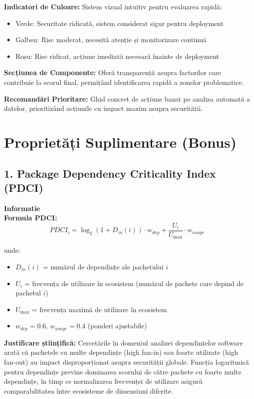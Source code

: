 \documentclass[12pt,a4paper]{article}
\newenvironment{infobox}{%
\begin{leftbar}
\color{black}
\textbf{Informatie}\\[0.5em]
}{%
\end{leftbar}
}
\begin{document}
\textbf{Indicatori de Culoare:} Sistem vizual intuitiv pentru evaluarea rapidă:

\begin{itemize}
\item Verde: Securitate ridicată, sistem considerat sigur pentru deployment
\item Galben: Risc moderat, necesită atenție și monitorizare continuă
\item Roșu: Risc ridicat, acțiune imediată necesară înainte de deployment
\end{itemize}

\textbf{Secțiunea de Componente:} Oferă transparență asupra factorilor care contribuie la scorul final, permițând identificarea rapidă a zonelor problematice.

\textbf{Recomandări Prioritare:} Ghid concret de acțiune bazat pe analiza automată a datelor, prioritizând acțiunile cu impact maxim asupra securității.

\section{Proprietăți Suplimentare (Bonus)}

\subsection{1. Package Dependency Criticality Index (PDCI)}

\begin{infobox}
\textbf{Formula PDCI:}
\[PDCI_i = \log_2(1 + D_{in}(i)) \cdot w_{dep} + \frac{U_i}{U_{\max}} \cdot w_{usage}\]

unde:
\begin{itemize}
\item $D_{in}(i)$ = numărul de dependințe ale pachetului $i$
\item $U_i$ = frecvența de utilizare în ecosistem (numărul de pachete care depind de pachetul $i$)
\item $U_{\max}$ = frecvența maximă de utilizare în ecosistem
\item $w_{dep} = 0.6$, $w_{usage} = 0.4$ (ponderi ajustabile)
\end{itemize}
\end{infobox}

\textbf{Justificare științifică:} Cercetările în domeniul analizei dependințelor software arată că pachetele cu multe dependințe (high fan-in) sau foarte utilizate (high fan-out) au impact disproporționat asupra securității globale. Funcția logaritmică pentru dependințe previne dominarea scorului de către pachete cu foarte multe dependințe, în timp ce normalizarea frecvenței de utilizare asigură comparabilitatea între ecosisteme de dimensiuni diferite.
\end{document}
